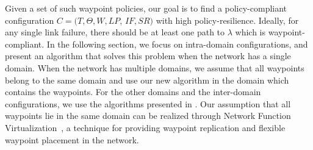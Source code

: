  Given a set of such waypoint policies, our goal is to
find a policy-compliant configuration 
$C=(T,\Theta,W,LP$, $IF,SR)$ 
with high policy-resilience. Ideally, for 
any single link failure, there should be at least 
one path to $\lambda$ which is waypoint-compliant. 
In the following section, we focus on 
intra-domain configurations,
and present an algorithm
that solves this problem when the network 
has a single domain.
When the network has multiple domains, 
we assume that all waypoints
belong to the same domain and
use our new algorithm in the domain 
which contains the waypoints. For the
other domains and the inter-domain configurations,
 we use the algorithms presented in . 
Our assumption that all waypoints lie in the same domain can be realized
through Network Function Virtualization~\cite{opennf, netbricks},
a technique for providing waypoint replication and 
 flexible waypoint placement in the network.



%









